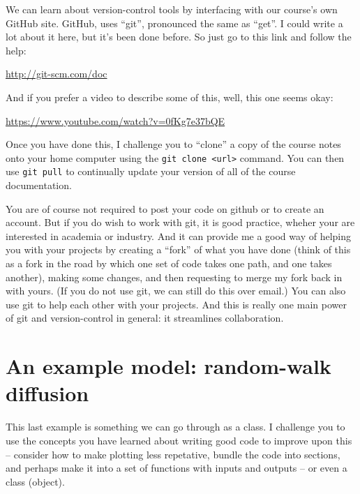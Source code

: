 \documentclass[a4paper,10pt]{scrartcl}
\begin{document}
We can learn about version-control tools by interfacing with our course's own GitHub site. GitHub, uses ``git'', pronounced the same as ``get''. I could write a lot about it here, but it's been done before. So just go to this link and follow the help:

\url{http://git-scm.com/doc}

And if you prefer a video to describe some of this, well, this one seems okay:

\url{https://www.youtube.com/watch?v=0fKg7e37bQE}

Once you have done this, I challenge you to ``clone'' a copy of the course notes onto your home computer using the \lstinline{git clone <url>} command. You can then use \lstinline{git pull} to continually update your version of all of the course documentation.

You are of course not required to post your code on github or to create an account. But if you do wish to work with git, it is good practice, wheher your are interested in academia or industry. And it can provide me a good way of helping you with your projects by creating a ``fork'' of what you have done (think of this as a fork in the road by which one set of code takes one path, and one takes another), making some changes, and then requesting to merge my fork back in with yours. (If you do not use git, we can still do this over email.) You can also use git to help each other with your projects. And this is really one main power of git and version-control in general: it streamlines collaboration.

\section{An example model: random-walk diffusion}

This last example is something we can go through as a class. I challenge you to use the concepts you have learned about writing good code to improve upon this -- consider how to make plotting less repetative, bundle the code into sections, and perhaps make it into a set of functions with inputs and outputs -- or even a class (object).


\end{document}
